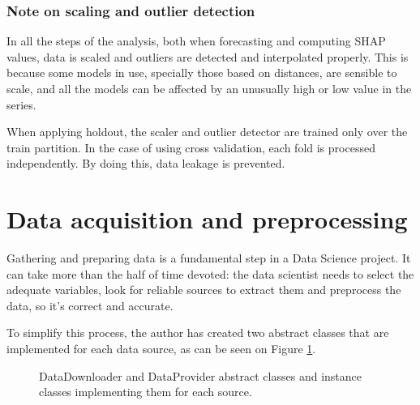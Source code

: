 \subsubsection{Note on scaling and outlier detection}
In all the steps of the analysis, both when forecasting and computing SHAP values, data is scaled and outliers are detected and interpolated properly. This is because some models in use, specially those based on distances, are sensible to scale, and all the models can be affected by an unusually high or low value in the series.

When applying holdout, the scaler and outlier detector are trained only over the train partition. In the case of using cross validation, each fold is processed independently. By doing this, data leakage is prevented.

\section{Data acquisition and preprocessing}
Gathering and preparing data is a fundamental step in a Data Science project. It can take more than the half of time devoted: the data scientist needs to select the adequate variables, look for reliable sources to extract them and preprocess the data, so it's correct and accurate.

To simplify this process, the author has created two abstract classes that are implemented for each data source, as can be seen on Figure \ref{fig:data-down-prov}.

\begin{figure}[H]
\centering
    \caption{DataDownloader and DataProvider abstract classes and instance classes implementing them for each source.}
    \label{fig:data-down-prov}
\end{figure}

